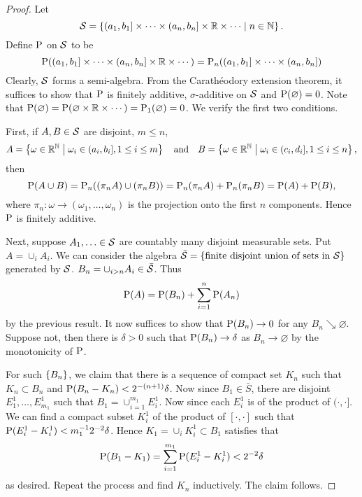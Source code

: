 \begin{proof}
    Let 
    \begin{equation*}
        \S = \Set{(a_1, b_1]\times\cdots\times(a_n, b_n]\times\R\times\cdots}{n\in\N}. 
    \end{equation*}
    Define $\P$ on $\S$ to be 
    \begin{equation*}
        \P((a_1, b_1]\times\cdots\times(a_n, b_n]\times\R\times\cdots) = \P_n((a_1, b_1]\times\cdots\times(a_n, b_n])
    \end{equation*}
    Clearly, $\S$ forms a semi-algebra. From the Carath\'eodory 
    extension theorem, it suffices to show that $\P$ is finitely 
    additive, $\sigma$-additive on $\S$ and $\P(\varnothing) = 0$. 
    Note that $\P(\varnothing) = \P(\varnothing\times\R\times\cdots) 
    = \P_1(\varnothing) = 0$. We verify the first two conditions. 

    First, if $A,B\in\S$ are disjoint, $m\leq n$,   
    \begin{equation*}
        A = \Set{\omega\in\R^\N}{\omega_i\in (a_i, b_i], 1\leq i\leq m}\quad\text{and}\quad 
        B = \Set{\omega\in\R^\N}{\omega_i\in (c_i, d_i], 1\leq i\leq n}, 
    \end{equation*}
    then 
    \begin{equation*}
        \P(A\cup B) = \P_n((\pi_n A)\cup(\pi_n B)) = \P_n(\pi_n A) + \P_n(\pi_n B) 
        = \P(A) + \P(B), 
    \end{equation*}
    where $\pi_n:\omega\to(\omega_1,\ldots,\omega_n)$ is the projection onto 
    the first $n$ components. Hence $\P$ is finitely additive. 

    Next, suppose $A_1,\ldots\in\S$ are countably many disjoint measurable sets. 
    Put $A = \cup_i A_i$. We can consider the algebra $\bar{\S} 
    = \set{\text{finite disjoint union of sets in $\S$}}$ generated by $\S$. 
    $B_n = \cup_{i>n} A_i\in\bar{\S}$. Thus 
    \begin{equation*}
        \P(A) = \P(B_n) + \sum_{i=1}^n\P(A_n) 
    \end{equation*} 
    by the previous result. It now suffices to show that 
    $\P(B_n)\to 0$ for any $B_n\searrow \varnothing$. Suppose 
    not, then there is $\delta > 0$ such that $\P(B_n)\to \delta$ 
    as $B_n\to\varnothing$ by the monotonicity of $\P$. 

    For such $\set{B_n}$, we claim that there is a sequence 
    of compact set $K_n$ such that $K_n\subset B_n$ and $\P(B_n-K_n)<2^{-(n+1)}\delta$. 
    Now since $B_1\in\bar{S}$, there are disjoint 
    $E_1^1,\ldots,E_{m_1}^1$ such that $B_1 = \cup_{i=1}^{m_1} E_i^1$. 
    Now since each $E_i^1$ is of the product of $(\cdot,\cdot]$. We can 
    find a compact subset $K_i^1$ of the product of $[\cdot,\cdot]$ such that 
    $\P(E_i^1 - K_i^1)<m_1^{-1}2^{-2}\delta$. Hence $K_1 = \cup_i K_i^1\subset B_1$ 
    satisfies that 
    \begin{equation*}
        \P(B_1 - K_1) = \sum_{i=1}^{m_1}\P(E_i^1 - K_i^1) < 2^{-2}\delta
    \end{equation*}
    as desired. Repeat the process and find $K_n$ inductively. 
    The claim follows. 


\end{proof}
